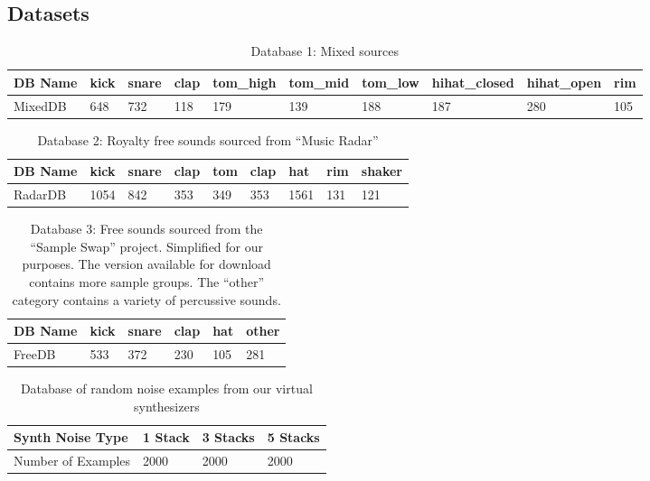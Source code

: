 \documentclass[runningheads,a4paper]{llncs}
\begin{document}
\begin{appendices}
\chapter{Datasets}
\label{appendix:A}
\begin{table}[h!]
\centering
\begin{tabular}[width=\paperwidth]{|l|l|l|l|l|l|l|l|l|l|}
\hline
DB Name & kick & snare & clap & tom\_high & tom\_mid & tom\_low & hihat\_closed &  hihat\_open & rim \\ \hline
MixedDB & 648 & 732 & 118 & 179 & 139 &  188 & 187 & 280 & 105 \\\hline
\end{tabular}
\caption{Database 1: Mixed sources}
\label{db:self}
\end{table}

\begin{table}[h!]
\centering
\begin{tabular}{|l|l|l|l|l|l|l|l|l|}
\hline
DB Name & kick & snare & clap & tom & clap & hat & rim & shaker  \\ \hline
RadarDB & 1054 & 842   & 353 & 349 &  353 & 1561& 131 & 121 \\ \hline
\end{tabular}
\caption{Database 2: Royalty free sounds sourced from \enquote{Music Radar}}
\label{db:radar}
\end{table}

\begin{table}[h!]
\centering
\begin{tabular}{|l|l|l|l|l|l|}
\hline
 DB Name & kick & snare & clap & hat & other \\\hline
 FreeDB & 533 & 372 & 230 & 105 & 281 \\ \hline
\end{tabular}
\caption{Database 3: Free sounds sourced from the \enquote{Sample Swap} project. Simplified for our purposes. The version available for download contains more sample groups. The \enquote{other} category contains a variety of percussive sounds.}
\label{db:sampleswap}
\end{table}


\begin{table}[h!]
\centering
\begin{tabular}{|l|l|l|l|}
\hline
 Synth Noise Type & 1 Stack & 3 Stacks  & 5 Stacks \\ \hline
 Number of Examples & 2000 & 2000 & 2000 \\ \hline
\end{tabular}
\caption{Database of random noise examples from our virtual synthesizers}
\label{db:noise}
\end{table}


\end{appendices}
\end{document}
